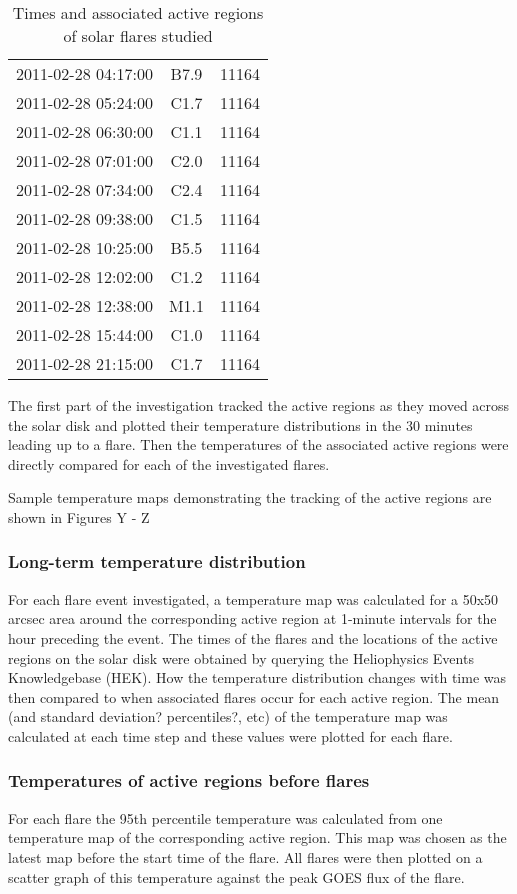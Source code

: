 \documentclass{article}
\begin{document}
\begin{table}
\begin{tabular}{c|c|c}
			2011-02-28 04:17:00 & B7.9 & 11164 \\ 
			2011-02-28 05:24:00 & C1.7 & 11164 \\ 
			2011-02-28 06:30:00 & C1.1 & 11164 \\ 
			2011-02-28 07:01:00 & C2.0 & 11164 \\ 
			2011-02-28 07:34:00 & C2.4 & 11164 \\ 
			2011-02-28 09:38:00 & C1.5 & 11164 \\ 
			2011-02-28 10:25:00 & B5.5 & 11164 \\ 
			2011-02-28 12:02:00 & C1.2 & 11164 \\ 
			2011-02-28 12:38:00 & M1.1 & 11164 \\ 
			2011-02-28 15:44:00 & C1.0 & 11164 \\ 
			2011-02-28 21:15:00 & C1.7 & 11164 \\
		\end{tabular}
	\caption{Times and associated active regions of solar flares studied}
	\label{tab:flares}
\end{table}

The first part of the investigation tracked the active regions as they moved across the solar disk and plotted their temperature distributions in the 30 minutes leading up to a flare.
Then the temperatures of the associated active regions were directly compared for each of the investigated flares.

Sample temperature maps demonstrating the tracking of the active regions are shown in Figures Y - Z

\subsubsection{Long-term temperature distribution}
For each flare event investigated, a temperature map was calculated for a 50x50 arcsec area around the corresponding active region at 1-minute intervals for the hour preceding the event. %
The times of the flares and the locations of the active regions on the solar disk were obtained by querying the Heliophysics Events Knowledgebase (HEK).
How the temperature distribution changes with time was then compared to when associated flares occur for each active region.
The mean (and standard deviation? percentiles?, etc) of the temperature map was calculated at each time step and these values were plotted for each flare.

\subsubsection{Temperatures of active regions before flares}
For each flare the 95th percentile temperature was calculated from one temperature map of the corresponding active region.
This map was chosen as the latest map before the start time of the flare. %
All flares were then plotted on a scatter graph of this temperature against the peak GOES flux of the flare.
\end{document}
